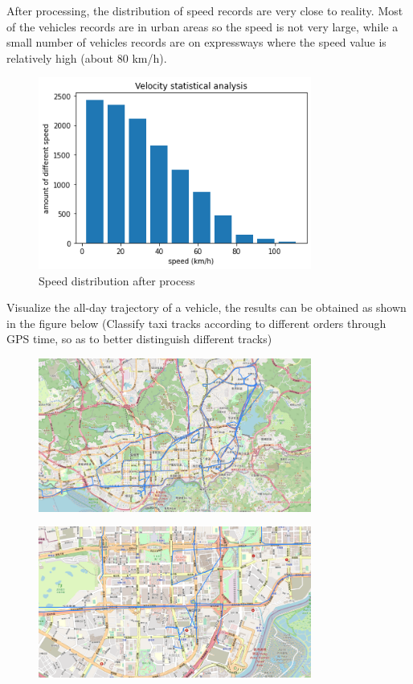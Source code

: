 \documentclass[fontset=none]{ctexart}
\theoremstyle{definition}
\theoremstyle{remark}
\begin{document}
\clearpage
After processing, the distribution of speed records are very close to reality. Most of the vehicles records are in urban areas so the speed is not very large, while a small number of vehicles records are on expressways where the speed value is relatively high (about 80 km/h).

\begin{figure}[htb]
  \centering
  \includegraphics[width=0.8\textwidth]{images/7-2-3.png}
  \caption{Speed distribution after process}
  \label{fig: 723}
\end{figure}

\clearpage
Visualize the all-day trajectory of a vehicle, the results can be obtained as shown in the figure below
(Classify taxi tracks according to different orders through GPS time, so as to better distinguish different tracks)
\begin{figure}[htb]
  \centering
  \includegraphics[width=0.8\textwidth]{images/7-2-4.png}
  \label{fig: 724}
\end{figure}
\begin{figure}[htb]
  \centering
  \includegraphics[width=0.8\textwidth]{images/7-2-5.png}
  \label{fig: 725}
\end{figure}
\end{document}
